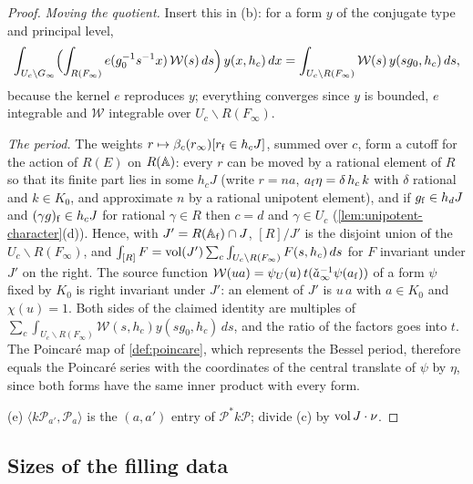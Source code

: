 \begin{proof}
\emph{Moving the quotient.} Insert this in (b): for a form $y$ of the conjugate type and principal level,
\[
  \int_{U_c\backslash G_\infty}\Bigl(\int_{R(F_\infty)}e(g_0^{-1}s^{-1}x)\,\mathcal W(s)\,ds\Bigr)\,y(x,h_c)\,dx=\int_{U_c\backslash R(F_\infty)}\mathcal W(s)\,y(sg_0,h_c)\,ds,
\]
because the kernel $e$ reproduces $y$; everything converges since $y$ is bounded, $e$ integrable and $\mathcal W$ integrable over $U_c\backslash R(F_\infty)$.

\emph{The period.} The weights $r\mapsto\beta_c(r_\infty)[r_{\rm f}\in h_cJ]$, summed over $c$, form a cutoff for the action of $R(E)$ on $R(\mathbb{A})$: every $r$ can be moved by a rational element of $R$ so that its finite part lies in some $h_cJ$ (write $r=na$, $a_{\rm f}\eta=\delta\,h_c\,k$ with $\delta$
rational and $k\in K_0$, and approximate $n$ by a rational unipotent element), and if $g_{\rm f}\in h_dJ$ and $(\gamma g)_{\rm f}\in h_cJ$ for rational $\gamma\in R$ then $c=d$ and $\gamma\in U_c$ (\cref{lem:unipotent-character}(d)). Hence, with $J'=R(\mathbb{A}_{\rm f})\cap J$, $[R]/J'$ is the disjoint union of the
$U_c\backslash R(F_\infty)$, and $\int_{[R]}F=\operatorname{vol}(J')\sum_c\int_{U_c\backslash R(F_\infty)}F(s,h_c)\,ds$ for $F$ invariant under $J'$ on the right. The source function $\mathcal W(ua)=\psi_U(u)\,t(\check a_\infty^{-1}\psi(a_{\rm f}))$ of a form $\psi$ fixed by $K_0$ is right invariant
under $J'$: an element of $J'$ is $u\,a$ with $a\in K_0$ and $\chi(u)=1$. Both sides of the claimed identity are multiples of $\sum_c\int_{U_c\backslash R(F_\infty)}\mathcal W(s,h_c)y(sg_0,h_c)\,ds$, and the ratio of the factors goes into $t$. The Poincar\'e map of \cref{def:poincare},
which represents the Bessel period, therefore equals the Poincar\'e series with the coordinates of the central translate of $\psi$ by $\eta$, since both forms have the same inner product with every form.

(e) $\langle k\mathcal P_{a'},\mathcal P_a\rangle$ is the $(a,a')$ entry of $\mathcal P^*k\mathcal P$; divide (c) by $\operatorname{vol} J\cdot\nu$.
\end{proof}

\subsection{Sizes of the filling data}\label{ss:filling-sizes}

